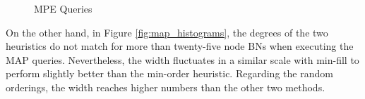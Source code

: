 \intextsep
\begin{figure}[H]%
    \centering
    \qquad
    \qquad
    \qquad
    \caption{MPE Queries}%
    \label{fig:mpe_histograms}%
\end{figure}

On the other hand, in Figure \ref{fig:map_histograms}, the degrees of the two heuristics do not match for more than twenty-five node BNs when executing the MAP queries. Nevertheless, the width fluctuates in a similar scale with min-fill to perform slightly better than the min-order heuristic. Regarding the random orderings, the width reaches higher numbers than the other two methods.

